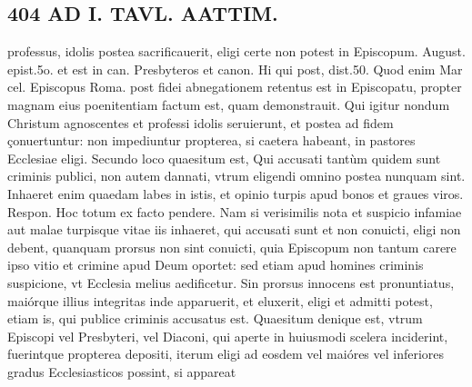 \documentclass{article}
\begin{document}
\begin{pages}
\section*{404 AD I. TAVL. AATTIM. }\pstart professus, idolis postea sacrificauerit, eligi certe non potest in Episcopum. August. epist.5o. et est in can. Presbyteros et canon. Hi qui post, dist.50. Quod enim Mar cel. Episcopus Roma. post fidei abnegationem retentus est in Episcopatu, propter magnam eius poenitentiam factum est, quam demonstrauit. Qui igitur nondum Christum agnoscentes et professi idolis seruierunt, et postea ad fidem çonuertuntur: non impediuntur propterea, si caetera habeant, in pastores Ecclesiae eligi.  \pend\pstart Secundo loco quaesitum est, Qui accusati tantùm quidem sunt criminis publici, non autem dannati, vtrum eligendi omnino postea nunquam sint. Inhaeret enim quaedam labes in istis, et opinio turpis apud bonos et graues viros. Respon. Hoc totum ex facto pendere. Nam si verisimilis nota et suspicio infamiae aut malae turpisque vitae iis inhaeret, qui accusati sunt et non conuicti, eligi non debent, quanquam prorsus non sint conuicti, quia Episcopum non tantum carere ipso vitio et crimine apud Deum oportet: sed etiam apud homines criminis suspicione, vt Ecclesia melius aedificetur. Sin prorsus innocens est pronuntiatus, maiórque illius integritas inde apparuerit, et eluxerit, eligi et admitti potest, etiam is, qui publice criminis accusatus est.  \pend\pstart Quaesitum denique est, vtrum Episcopi vel Presbyteri, vel Diaconi, qui aperte in huiusmodi scelera inciderint, fuerintque propterea depositi, iterum eligi ad eosdem vel maióres vel inferiores gradus Ecclesiasticos possint, si appareat  \pend

\end{pages}
\end{document}
